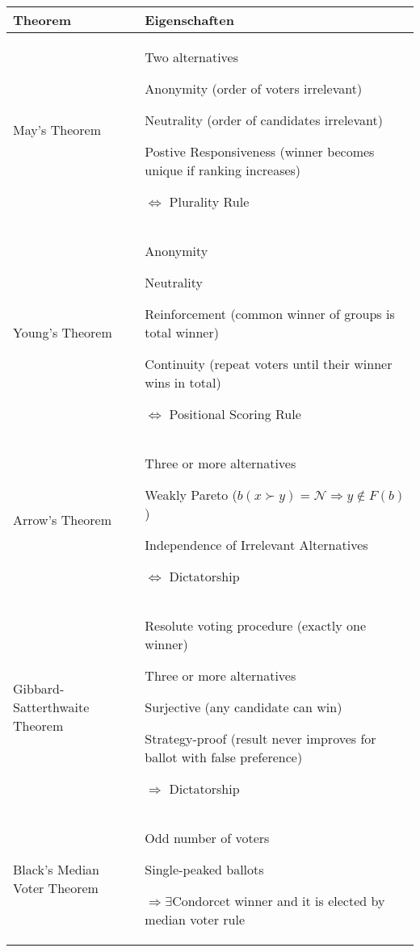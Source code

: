 \documentclass[11pt]{scrartcl}
\begin{document}
\begin{xltabular}{\linewidth}{p{40mm}p{100mm}}
    \textbf{Theorem} &
    \textbf{Eigenschaften} \\ \hline

    May's Theorem &
    Two alternatives

    Anonymity (order of voters irrelevant)

    Neutrality (order of candidates irrelevant)

    Postive Responsiveness (winner becomes unique if ranking increases)

    $\Leftrightarrow$ Plurality Rule \\ \hline

    Young's Theorem &
    Anonymity

    Neutrality

    Reinforcement (common winner of groups is total winner)

    Continuity (repeat voters until their winner wins in total)
    
    $\Leftrightarrow$ Positional Scoring Rule \\ \hline

    Arrow's Theorem &

    Three or more alternatives

    Weakly Pareto ($b(x \succ y) = \mathcal{N} \Rightarrow y \notin F(b)$) 
    
    Independence of Irrelevant Alternatives 
    
    $\Leftrightarrow$ Dictatorship\\ \hline

    Gibbard-Satterthwaite Theorem &
    Resolute voting procedure (exactly one winner)

    Three or more alternatives

    Surjective (any candidate can win)

    Strategy-proof (result never improves for ballot with false preference)

    $\Rightarrow$ Dictatorship \\ \hline

    Black's Median Voter Theorem &
    Odd number of voters

    Single-peaked ballots

    $\Rightarrow \exists$Condorcet winner and it is elected by median voter rule \\ \hline

\end{xltabular}
\end{document}
